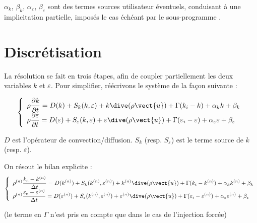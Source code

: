 $\alpha_k$, $\beta_k$, $\alpha_\varepsilon$, $\beta_\varepsilon$ sont des termes
sources utilisateur \'eventuels, conduisant \`a une implicitation partielle, impos\'es le cas
\'ech\'eant par le sous-programme .

\section{Discr\'etisation}
La r\'esolution se fait en trois \'etapes, afin de coupler partiellement les
deux variables $k$ et $\varepsilon$. Pour simplifier, r\'e\'ecrivons le
syst\`eme de la fa\c con suivante :

\begin{equation}
\left\{\begin{array}{l}
\displaystyle
\rho\frac{\partial k}{\partial t} =
D(k) + S_k(k,\varepsilon)+k\dive(\rho\vect{u})+\Gamma(k_i-k)+\alpha_k k +\beta_k\\
\displaystyle
\rho\frac{\partial \varepsilon}{\partial t}  =
D(\varepsilon) + S_\varepsilon(k,\varepsilon)
+\varepsilon\dive(\rho\vect{u})
+\Gamma(\varepsilon_i-\varepsilon)+\alpha_\varepsilon \varepsilon +\beta_\varepsilon
\end{array}\right.
\end{equation}

$D$ est l'op\'erateur de convection/diffusion.
$S_k$ (resp. $S_\varepsilon$) est le terme source de $k$ (resp. $\varepsilon$).


On r\'esout le bilan explicite :
\begin{equation}
\left\{\begin{array}{l}
\displaystyle
\rho^{(n)}\frac{k_e-k^{(n)}}{\Delta t} =
D(k^{(n)}) + S_k(k^{(n)},\varepsilon^{(n)})
+k^{(n)}\dive(\rho\vect{u})+\Gamma(k_i-k^{(n)})+\alpha_k k^{(n)} +\beta_k\\
\displaystyle
\rho^{(n)}\frac{\varepsilon_e-\varepsilon^{(n)}}{\Delta t}  =
D(\varepsilon^{(n)}) + S_\varepsilon(k^{(n)},\varepsilon^{(n)})
+\varepsilon^{(n)}\dive(\rho\vect{u})
+\Gamma(\varepsilon_i-\varepsilon^{(n)})
+\alpha_\varepsilon \varepsilon^{(n)} +\beta_\varepsilon
\end{array}\right.
\end{equation}

(le terme en $\Gamma$ n'est pris en compte que dans le cas de l'injection forc\'ee)

